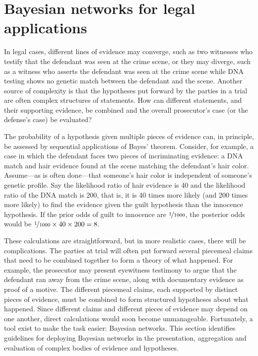 \documentclass{article}
\begin{document}
\section{Bayesian networks for legal applications}\label{sec:BNs}
 
 
In legal cases, different lines of evidence may converge, such as two witnesses %
who testify that the defendant was seen at the crime scene, or they may diverge, such as a witness who asserts the defendant was seen at the crime scene while DNA testing shows no genetic match between the defendant and the scene. Another source of complexity is that the hypotheses put forward by the parties in a trial are often complex structures of statements. 
How can different statements, and their supporting evidence, be combined and the overall prosecutor's case (or the defense's case) be evaluated?


The probability of a hypothesis  given multiple pieces of evidence can, in principle, be assessed by sequential applications of Bayes' theorem. 
Consider, for example, a case in which the defendant faces two pieces of incriminating evidence: a DNA match and hair evidence found at the scene matching the defendant's hair color.
Assume---as is often 
done---that someone's hair color is independent of someone's genetic profile. Say the likelihood ratio of hair evidence is 40 and the likelihood ratio of the DNA match is 200, that is, it is 40 times more likely (and 200 times more likely) to find the evidence given the guilt hypothesis than the innocence hypothesis. If the prior odds of guilt to innocence are $\nicefrac{1}{1000}$, the posterior odds would be $\nicefrac{1}{1000}\times 40\times 200=8$.  




These calculations are straightforward, but 
in more realistic cases, there will be complications. The parties at trial will often put forward several piecemeal claims that 
need to be combined together to form a theory of what happened.  For example, the prosecutor may present eyewitness testimony to argue that the defendant ran away from the crime scene, along with documentary evidence as proof of a motive.  
The different piecemeal claims, each supported by  distinct pieces of evidence, must be combined to form structured hypotheses about what happened. Since  different claims and different 
pieces of evidence may depend on one another, 
direct  calculations would soon become unmanageable.  Fortunately, a tool exist to make the task easier: Bayesian networks. %
This section identifies guidelines for deploying Bayesian networks in the presentation, aggregation and evaluation of complex bodies of evidence and 
hypotheses. 
\end{document}
